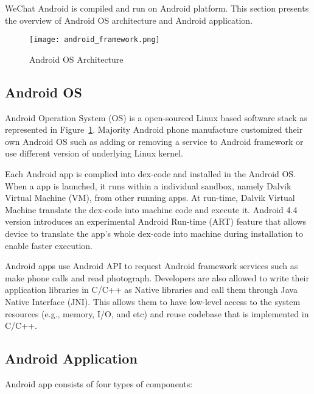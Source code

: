 WeChat Android is compiled and run on Android platform. This section presents the overview 
of Android OS architecture and Android application. 

\begin{figure}
	\centering
	\texttt{[image: android\_framework.png]}%
	\caption{Android OS Architecture}
	\label{fig:androw_framework}
\end{figure}

\subsection{Android OS}
Android Operation System (OS) is a open-sourced Linux based software stack as represented in 
Figure~\ref{fig:androw_framework}. Majority Android phone manufacture customized their own 
Android OS such as adding or removing a service to Android framework or use different version of 
underlying Linux kernel.

Each Android app is complied into dex-code and installed in the Android OS. When a app is 
launched, it runs within a individual sandbox, namely Dalvik Virtual Machine (VM), from other 
running apps. At run-time, Dalvik Virtual Machine translate the dex-code into machine code and 
execute it. Android 4.4 version introduces an experimental Android Run-time (ART) feature that 
allows device to translate the app's whole dex-code into machine during installation to enable 
faster execution. 

Android apps use Android API to request Android framework services such as make 
phone calls and read photograph. Developers are also allowed to write their application libraries 
in C/C++ as Native libraries and call them through Java Native Interface (JNI). This allows them 
to have low-level access to the system resources (e.g., memory, I/O, and etc) and reuse 
codebase that is implemented in C/C++.  



\subsection{Android Application}
Android app consists of four types of components:

